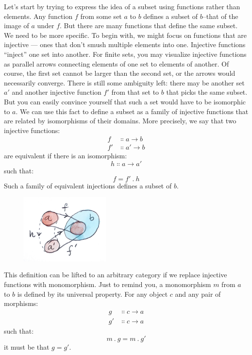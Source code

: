 Let's start by trying to express the idea of a subset using functions
rather than elements. Any function $f$ from some set $a$
to $b$ defines a subset of $b$--that of the image of
$a$ under $f$. But there are many functions that define
the same subset. We need to be more specific. To begin with, we might
focus on functions that are injective --- ones that don't smush multiple
elements into one. Injective functions ``inject'' one set into another.
For finite sets, you may visualize injective functions as parallel
arrows connecting elements of one set to elements of another. Of course,
the first set cannot be larger than the second set, or the arrows would
necessarily converge. There is still some ambiguity left: there may be
another set $a'$ and another injective function
$f'$ from that set to $b$ that picks the same
subset. But you can easily convince yourself that such a set would have
to be isomorphic to $a$. We can use this fact to define a subset
as a family of injective functions that are related by isomorphisms of
their domains. More precisely, we say that two injective functions:
\begin{align*}
  f  & \Colon a \to b  \\
  f' & \Colon a' \to b
\end{align*}
are equivalent if there is an isomorphism:
\[h \Colon a \to a'\]
such that:
\[f = f'\ .\ h\]
Such a family of equivalent injections defines a subset of $b$.

\begin{figure}[H]
  \centering
  \includegraphics[width=0.4\textwidth]{images/subsetinjection.jpg}
\end{figure}

\noindent
This definition can be lifted to an arbitrary category if we replace
injective functions with monomorphism. Just to remind you, a
monomorphism $m$ from $a$ to $b$ is defined by its
universal property. For any object $c$ and any pair of morphisms:
\begin{align*}
  g  & \Colon c \to a \\
  g' & \Colon c \to a
\end{align*}
such that:
\[m\ .\ g = m\ .\ g'\]
it must be that $g = g'$.

